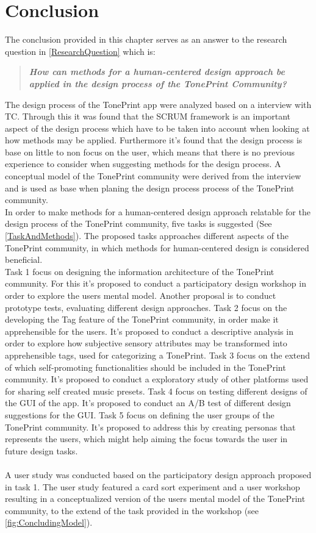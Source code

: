 \chapter{Conclusion}
\label{Conclusion}
%
The conclusion provided in this chapter serves as an answer to the research question in \autoref{ResearchQuestion} which is:

\begin{quote}
	\textbf{\textit{How can methods for a human-centered design approach be applied in the design process of the TonePrint Community?}}
\end{quote}

The design process of the TonePrint app were analyzed based on a interview with TC. Through this it was found that the SCRUM framework is an important aspect of the design process which have to be taken into account when looking at how methods may be applied. Furthermore it's found that the design process is base on little to non focus on the user, which means that there is no previous experience to consider when suggesting methods for the design process. A conceptual model of the TonePrint community were derived from the interview and is used as base when planing the design process process of the TonePrint community.\\
In order to make methods for a human-centered design approach relatable for the design process of the TonePrint community, five tasks is suggested (See \autoref{TaskAndMethods}). The proposed tasks approaches different aspects of the TonePrint community, in which methods for human-centered design is considered beneficial.\\
Task 1 focus on designing the information architecture of the TonePrint community. For this it's proposed to conduct a participatory design workshop in order to explore the users mental model. Another proposal is to conduct prototype tests, evaluating different design approaches. Task 2 focus on the developing the Tag feature of the TonePrint community, in order make it apprehensible for the users. It's proposed to conduct a descriptive analysis in order to explore how subjective sensory attributes may be transformed into apprehensible tags, used for categorizing a TonePrint. Task 3 focus on the extend of which self-promoting functionalities should be included in the TonePrint community. It's proposed to conduct a exploratory study of other platforms used for sharing self created music presets. Task 4 focus on testing different designs of the GUI of the app. It's proposed to conduct an A/B test of different design suggestions for the GUI. Task 5 focus on defining the user groups of the TonePrint community. It's proposed to address this by creating personas that represents the users, which might help aiming the focus towards the user in future design tasks. \\
\\
A user study was conducted based on the participatory design approach proposed in task 1. The user study featured a card sort experiment and a user workshop resulting in a conceptualized version of the users mental model of the TonePrint community, to the extend of the task provided in the workshop (see \autoref{fig:ConcludingModel}).